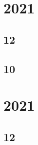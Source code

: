 \documentclass[11pt]{book}
\begin{document}
\section{2021}
\subsection{12}

\subsection{10}

\section{2021}
\subsection{12}

%


% 
\backmatter
\appendix
\iffalse
\chapter{Conic Lines}
\section{Pair of Straight Lines}
%

\section{Intersection of Conics}

\section{ Chords of a Conic}

\section{ Tangent and Normal}

\fi
%

%
%
%
\latexprintindex
\end{document}
